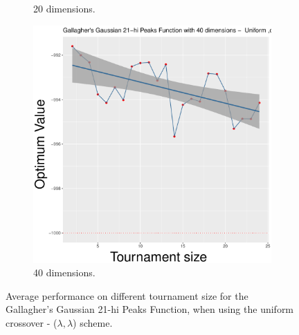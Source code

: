 \begin{figure}[t]
\begin{subfigure}[b]{0.33\textwidth}
		\caption{20 dimensions.}
	\end{subfigure}
	\begin{subfigure}[b]{0.33\textwidth}
		\centering
		\includegraphics[width=\textwidth]{img/uniform-40D/multimodal_uniform_22_dim_40.pdf}
		\caption{40 dimensions.}
	\end{subfigure}
	\caption{Average performance on different tournament size for the Gallagher's Gaussian 21-hi Peaks Function, when using the uniform crossover - ($\lambda, \lambda$) scheme.}
	\label{uniform-22-a}
\end{figure}

